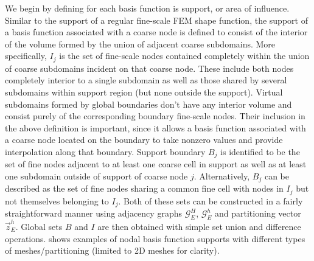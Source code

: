 We begin by defining for each basis function is support, or area of influence.   Similar to the support of a regular fine-scale FEM shape function, the support of a basis function associated with a coarse node is defined to consist of the interior of the volume formed by the union of adjacent coarse subdomains.   More specifically, $I_j$ is the set of fine-scale nodes contained completely within the union of coarse subdomains incident on that coarse node.   These include both nodes completely interior to a single subdomain as well as those shared by several subdomains within support region (but none outside the support).   Virtual subdomains formed by global boundaries don't have any interior volume and consist purely of the corresponding boundary fine-scale nodes.   Their inclusion in the above definition is important, since it allows a basis function associated with a coarse node located on the boundary to take nonzero values and provide interpolation along that boundary.   Support boundary $B_j$ is identified to be the set of fine nodes adjacent to at least one coarse cell in support as well as at least one subdomain outside of support of coarse node $j$.   Alternatively, $B_j$ can be described as the set of fine nodes sharing a common fine cell with nodes in $I_j$ but not themselves belonging to $I_j$.   Both of these sets can be constructed in a fairly straightforward manner using adjacency graphs $\mathcal{G}_E^H$, $\mathcal{G}_E^h$ and partitioning vector $\vec{z}_E^h$.   Global sets $B$ and $I$ are then obtained with simple set union and difference operations.    shows examples of nodal basis function supports with different types of meshes/partitioning (limited to 2D meshes for clarity).

